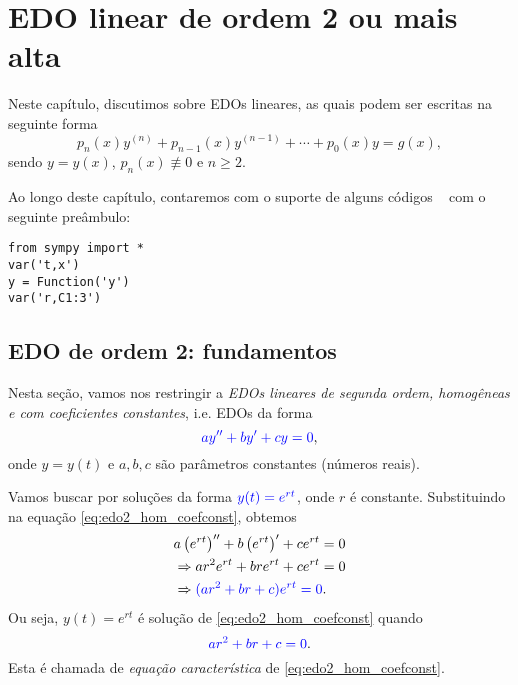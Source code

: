 
\chapter{EDO linear de ordem 2 ou mais alta}\label{cap_edolin}
\thispagestyle{fancy}

Neste capítulo, discutimos sobre EDOs lineares, as quais podem ser escritas na seguinte forma
\begin{equation}
  p_n(x)y^{(n)} + p_{n-1}(x)y^{(n-1)} + \cdots + p_0(x)y = g(x),
\end{equation}
sendo $y = y(x)$, $p_n(x)\not\equiv 0$ e $n\geq 2$.

\ifispython
\begin{obs}\label{obs:cap_edolin_python}
Ao longo deste capítulo, contaremos com o suporte de alguns códigos \python~ com o seguinte preâmbulo:
\begin{verbatim}
from sympy import *
var('t,x')
y = Function('y')
var('r,C1:3')
\end{verbatim}
\end{obs}
\fi


\section{EDO de ordem 2: fundamentos}\label{cap_edolin_sec_edo2I}

Nesta seção, vamos nos restringir a \emph{EDOs lineares de segunda ordem, homogêneas e com coeficientes constantes}, i.e. EDOs da forma
\begin{equation}\label{eq:edo2_hom_coefconst}
  {\color{blue}ay'' + by' + cy = 0},
\end{equation}
onde $y = y(t)$ e $a, b, c$ são parâmetros constantes (números reais).

Vamos buscar por soluções da forma ${\color{blue}y(t) = e^{rt}}$, onde $r$ é constante. Substituindo na equação \eqref{eq:edo2_hom_coefconst}, obtemos
\begin{align}
  & a\left(e^{rt}\right)'' + b\left(e^{rt}\right)' + ce^{rt} = 0 \\
  & \Rightarrow ar^2e^{rt} + bre^{rt} + ce^{rt} = 0 \\
  & \Rightarrow {\color{blue}(ar^2 + br + c)e^{rt} = 0}.
\end{align}
Ou seja, $y(t) = e^{rt}$ é solução de \eqref{eq:edo2_hom_coefconst} quando
\begin{equation}
  {\color{blue}ar^2 + br + c = 0}.
\end{equation}
Esta é chamada de \emph{equação característica} de \eqref{eq:edo2_hom_coefconst}.


